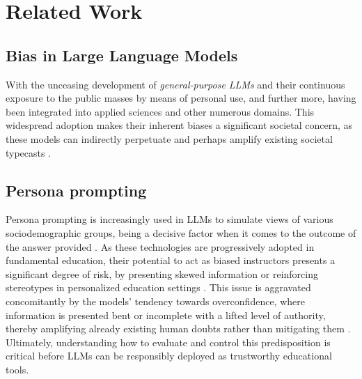 \documentclass[11pt]{article}
\begin{document}


\section{Related Work}
\subsection{Bias in Large Language Models}
With the unceasing development of \textit{general-purpose LLMs} and their continuous exposure to the public masses by means of personal use, and further more, having been integrated into applied sciences and other numerous domains\cite{guo2024}. This widespread adoption makes their inherent biases a significant societal concern, as these models can indirectly perpetuate and perhaps amplify existing societal typecasts \cite{kumar2024}.

\subsection{Persona prompting}
Persona prompting is increasingly used in LLMs to simulate views of various sociodemographic groups, being a decisive factor when it comes to the outcome of the answer provided \cite{lutz2025}. As these technologies are progressively adopted in fundamental education, their potential to act as biased instructors presents a significant degree of risk, by presenting skewed information or reinforcing stereotypes in personalized education settings \cite{weissburg2025}. This issue is aggravated concomitantly by the models' tendency towards overconfidence, where information is presented bent or incomplete with a lifted level of authority, thereby amplifying already existing human doubts rather than mitigating them \cite{sun2025}. Ultimately, understanding how to evaluate and control this predisposition is critical before LLMs can be responsibly deployed as trustworthy educational tools.
\end{document}
